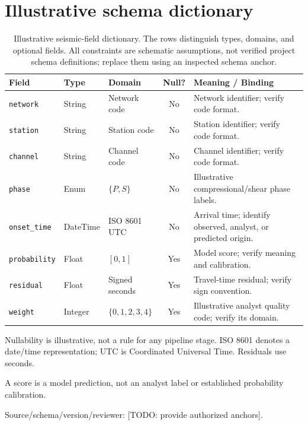 \documentclass{article}
\begin{document}
\section*{Illustrative schema dictionary}

\begin{table}[htbp]
  \centering
  \small
  \begin{threeparttable}
    \caption{Illustrative seismic-field dictionary.
      The rows distinguish types, domains, and optional fields.
      All constraints are schematic assumptions, not verified project
      schema definitions; replace them using an inspected schema anchor.}
    \label{tab:data-dictionary}
    \begin{tabularx}{\linewidth}{@{} l l l c X @{}}
      \toprule
      \textbf{Field} & \textbf{Type} & \textbf{Domain}
        & \textbf{Null?\tnote{a}} & \textbf{Meaning / Binding} \\
      \midrule
      \texttt{network} & String & Network code & No
        & Network identifier; verify code format. \\
      \texttt{station} & String & Station code & No
        & Station identifier; verify code format. \\
      \texttt{channel} & String & Channel code & No
        & Channel identifier; verify code format. \\
      \texttt{phase} & Enum & $\{P,S\}$ & No
        & Illustrative compressional/shear phase labels. \\
      \texttt{onset\_time} & DateTime & ISO 8601 UTC & No
        & Arrival time; identify observed, analyst, or predicted origin. \\
      \texttt{probability} & Float & $[0,1]$ & Yes
        & Model score; verify meaning and calibration.\tnote{b} \\
      \texttt{residual} & Float & Signed seconds & Yes
        & Travel-time residual; verify sign convention. \\
      \texttt{weight} & Integer & $\{0,1,2,3,4\}$ & Yes
        & Illustrative analyst quality code; verify its domain. \\
      \bottomrule
    \end{tabularx}
    \begin{tablenotes}[flushleft]
      \footnotesize
      \item[a] Nullability is illustrative, not a rule for any pipeline stage.
      ISO 8601 denotes a date/time representation; UTC is Coordinated
      Universal Time. Residuals use seconds.
      \item[b] A score is a model prediction, not an analyst label or
      established probability calibration.
      \item Source/schema/version/reviewer: [TODO: provide authorized anchors].
    \end{tablenotes}
  \end{threeparttable}
\end{table}
\end{document}
